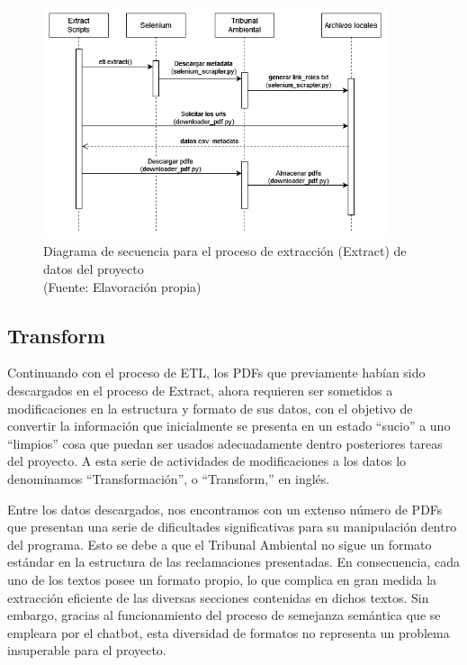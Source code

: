 \begin{figure}[ht!]
    \centering
    \includegraphics[width=0.9\textwidth]{figures/extract_diagram.png}
    \caption[Diagrama de secuencia para el proceso de extracción (Extract) de datos del proyecto]{Diagrama de secuencia para el proceso de extracción (Extract) de datos del proyecto\\
    {\scriptsize (Fuente: Elavoración propia)}}
    \label{fig:extract_diagram}
\end{figure}


\newpage

\subsection{Transform}

\par Continuando con el proceso de ETL, los PDFs que previamente habían sido descargados en el proceso de Extract,
ahora requieren ser sometidos a modificaciones en la estructura y formato de sus datos, con el objetivo de convertir la información que inicialmente se presenta en un 
estado ``sucio'' a uno  ``limpios'' cosa que puedan ser usados adecuadamente dentro posteriores tareas del proyecto. A esta serie de actividades de modificaciones a los datos lo denominamos
``Transformación'', o ``Transform,'' en inglés.

\par Entre los datos descargados, nos encontramos con un extenso número de PDFs que presentan una serie de dificultades significativas para su 
manipulación dentro del programa. Esto se debe a que el Tribunal Ambiental no sigue un formato estándar en la estructura de las reclamaciones 
presentadas. En consecuencia, cada uno de los textos posee un formato propio, lo que complica en gran medida la extracción 
eficiente de las diversas secciones contenidas en dichos textos. Sin embargo, gracias al funcionamiento del proceso de semejanza 
semántica que se empleara por el chatbot, esta diversidad de formatos no representa un problema insuperable para el proyecto.

